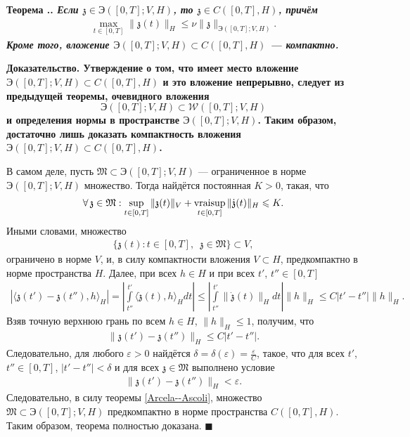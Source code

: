 \documentclass{report}
\newcounter{rem}[section]
\newcounter{theor}[section]
\renewcommand{\thetheor}{\thesection.\arabic{theor}}
\newenvironment{Theorem}{\par\refstepcounter{theor}\bf Теорема \thetheor. \it}{\rm\par}
\newenvironment{Proof}{\par\noindent\bf Доказательство.\rm}{ $\blacksquare$\par}
\newcommand{\vraisup}{\mathop{\rm vraisup}}
\begin{document}
\begin{Theorem}\label{abstact_energetic_class_embedding:Theorem}
Если $\mathfrak{z}\in \textrm{Э}([0,T];V,H)$, то $\mathfrak{z}\in C([0,T],H)$, причём
\begin{gather*}
\max\limits_{t\in[0,T]}\|\mathfrak{z}(t)\|_H\leqslant\nu\|\mathfrak{z}\|_{\textrm{Э}([0,T];V,H)}.
\end{gather*}
Кроме того, вложение $\textrm{Э}([0,T];V,H)\subset C([0,T],H)$ --- компактно.
\end{Theorem}
\begin{Proof} Утверждение о том, что имеет место вложение $\textrm{Э}([0,T];V,H)\subset C([0,T],H)$ и это вложение непрерывно, следует из
предыдущей теоремы, очевидного вложения $$\textrm{Э}([0,T];V,H)\subset\mathcal{W}([0,T];V,H)$$ и определения нормы в пространстве $\textrm{Э}([0,T];V,H)$.
Таким образом, достаточно лишь доказать компактность вложения $\textrm{Э}([0,T];V,H)\subset C([0,T],H)$.

В самом деле, пусть $\mathfrak{M}\subset \textrm{Э}([0,T];V,H)$ --- ограниченное в норме $\textrm{Э}([0,T];V,H)$ множество. Тогда найдётся постоянная $K>0$, такая, что
\begin{gather*}
\forall\,\mathfrak{z}\in\mathfrak{M}:\sup\limits_{t\in[0,T]}\|\mathfrak{z}(t)\|_V+\vraisup\limits_{t\in[0,T]}\|\dot{\mathfrak{z}}(t)\|_H
\leqslant K.
\end{gather*}
Иными словами, множество
\begin{gather*}
\{\mathfrak{z}(t):t\in[0,T],\,\,\,\mathfrak{z}\in\mathfrak{M}\}\subset V,
\end{gather*}
ограничено в норме $V$, и, в силу компактности вложения $V\subset H$, предкомпактно в норме пространства $H$. Далее, при всех $h\in H$ и при всех $t'$, $t''\in[0,T]$
\begin{gather*}
|\langle\mathfrak{z}(t')-\mathfrak{z}(t''),h\rangle_H|=\left|\int\limits_{t''}^{t'}\langle\dot{\mathfrak{z}}(t),h\rangle_Hdt\right|
\leqslant\left|\int\limits_{t''}^{t'}\|\dot{\mathfrak{z}}(t)\|_Hdt\right|\|h\|_H\leqslant C|t'-t''|\|h\|_H.
\end{gather*}
Взяв точную верхнюю грань по всем $h\in H$, $\|h\|_H\leqslant1$, получим, что
\begin{gather*}
\|\mathfrak{z}(t')-\mathfrak{z}(t'')\|_H\leqslant C|t'-t''|.
\end{gather*}
Следовательно, для любого $\varepsilon>0$ найдётся $\delta=\delta(\varepsilon)=\frac\varepsilon C$, такое, что для всех $t'$, $t''\in[0,T]$, $|t'-t''|<\delta$ и для всех $\mathfrak{z}\in
\mathfrak{M}$ выполнено  условие
\begin{gather*}
\|\mathfrak{z}(t')-\mathfrak{z}(t'')\|_H<\varepsilon.
\end{gather*}
Следовательно, в силу теоремы \ref{Arcela--Ascoli}, множество $\mathfrak{M}\subset \textrm{Э}([0,T];V,H)$ предкомпактно в норме пространства $C([0,T],H)$. Таким образом, теорема полностью
доказана.
\end{Proof}
\end{document}
